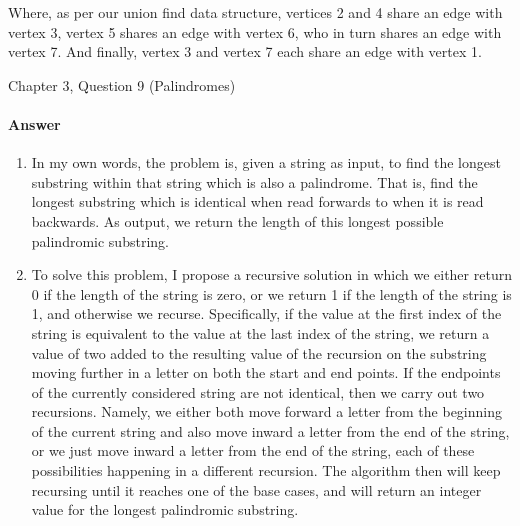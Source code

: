 \documentclass{article}
\begin{document}
Where, as per our union find data structure, vertices 2 and 4 share an edge 
with vertex 3, vertex 5 shares an edge with vertex 6, who in turn shares an 
edge with vertex 7. And finally, vertex 3 and vertex 7 each share an edge 
with vertex 1.

\nextprob
{}

Chapter 3, Question 9 (Palindromes)

\paragraph{Answer}


\begin{enumerate}
	\item In my own words, the problem is, given a string as input,
		to find the longest substring within that string which
		is also a palindrome. That is, find the longest substring
		which is identical when read forwards to when it is read 
		backwards. As output, we return the length of this longest
		possible palindromic substring.
	\item To solve this problem, I propose a recursive solution in which
		we either return 0 if the length of the string is zero, or we
		return 1 if the length of the string is 1, and otherwise
		we recurse. Specifically, if the value at the first index of 
		the string is equivalent to the value at the last index of
		the string, we return a value of two added to the resulting
		value of the recursion on the substring moving further in a
		letter on both the start and end points. If the endpoints
		of the currently considered string are not identical, then 
		we carry out two recursions. Namely, we either both move forward a letter
		from the beginning of the current string and also move inward a letter
		from the end of the string, or we just move inward a letter from the end of
		the string, each of these possibilities happening in a different recursion. 
		The algorithm then will keep recursing until it reaches one
		of the base cases, and will return an integer value for the 
		longest palindromic substring. 


\end{enumerate}
\end{document}
